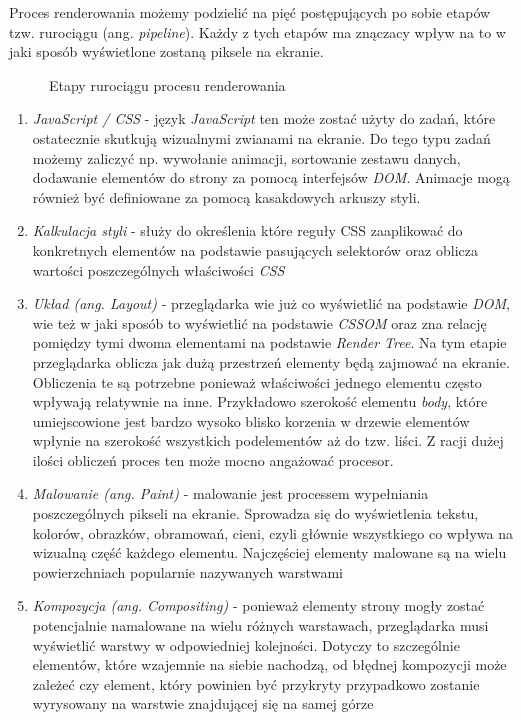 \documentclass[polish, twoside, 12pt]{mwart}
\begin{document}
Proces renderowania możemy podzielić na pięć postępujących po sobie etapów tzw. rurociągu (ang. \emph{pipeline}). Każdy z tych etapów ma znączacy wpływ na to w jaki sposób wyświetlone zostaną piksele na ekranie.

\begin{figure}[ht]
	\caption{Etapy rurociągu procesu renderowania}
\end{figure}

\begin{enumerate}
  \item \emph{JavaScript / CSS} - język \emph{JavaScript} ten może zostać użyty do zadań, które ostatecznie skutkują wizualnymi zwianami na ekranie. Do tego typu zadań możemy zaliczyć np. wywołanie animacji, sortowanie zestawu danych, dodawanie elementów do strony za pomocą interfejsów \emph{DOM}. Animacje mogą również być definiowane za pomocą kasakdowych arkuszy styli.
  \item \emph{Kalkulacja styli} - służy do określenia które reguły CSS zaaplikować do konkretnych elementów na podstawie pasujących selektorów oraz oblicza wartości poszczególnych właściwości \emph{CSS}
  \item \emph{Układ (ang. Layout)} - przeglądarka wie już co wyświetlić na podstawie \emph{DOM}, wie też w jaki sposób to wyświetlić na podstawie \emph{CSSOM} oraz zna relację pomiędzy tymi dwoma elementami na podstawie \emph{Render Tree}. Na tym etapie przeglądarka oblicza jak dużą przestrzeń elementy będą zajmować na ekranie. Obliczenia te są potrzebne ponieważ właściwości jednego elementu często wpływają relatywnie na inne. Przykładowo szerokość elementu \emph{body}, które umiejscowione jest bardzo wysoko blisko korzenia w drzewie elementów wpłynie na szerokość wszystkich podelementów aż do tzw. liści. Z racji dużej ilości obliczeń proces ten może mocno angażować procesor.
  \item \emph{Malowanie (ang. Paint)} - malowanie jest processem wypełniania poszczególnych pikseli na ekranie. Sprowadza się do wyświetlenia tekstu, kolorów, obrazków, obramowań, cieni, czyli głównie wszystkiego co wpływa na wizualną część każdego elementu. Najczęściej elementy malowane są na wielu powierzchniach popularnie nazywanych warstwami
  \item \emph{Kompozycja (ang. Compositing)} - ponieważ elementy strony mogły zostać potencjalnie namalowane na wielu różnych warstawach, przeglądarka musi wyświetlić warstwy w odpowiedniej kolejności. Dotyczy to szczególnie elementów, które wzajemnie na siebie nachodzą, od błędnej kompozycji może zależeć czy element, który powinien być przykryty przypadkowo zostanie wyrysowany na warstwie znajdującej się na samej górze
\end{enumerate}
\end{document}
